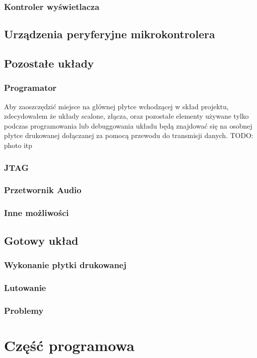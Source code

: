 \documentclass[a4paper]{report}
\begin{document}
			\subsection{Kontroler wyświetlacza}
		\section{Urządzenia peryferyjne mikrokontrolera}
		\section{Pozostałe układy}
			\subsection{Programator}
				\label{sec:programator}
				Aby zaoszczędzić miejsce na głównej płytce wchodzącej w skład projektu, zdecydowałem że układy scalone, złącza, oraz pozostałe elementy używane tylko podczas programowania lub debuggowania układu będą znajdować się na osobnej płytce drukowanej dołączanej za pomocą przewodu do transmisji danych. TODO: photo itp
			\subsection{JTAG}
				\label{sec:jtag}
			\subsection{Przetwornik Audio}
			\subsection{Inne możliwości}
		\section{Gotowy układ}
			\subsection{Wykonanie płytki drukowanej}
			\subsection{Lutowanie}
			\subsection{Problemy}

	\chapter{Część programowa}
\end{document}
